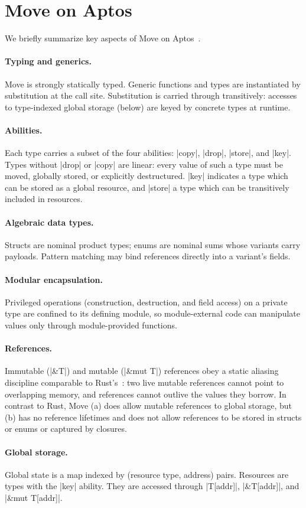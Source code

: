 \section{Move on Aptos}
\label{sec:move}

We briefly summarize key aspects of Move on Aptos~\cite{MoveOnAptosBook,blackshear2020resources}.

\paragraph{Typing and generics.}
Move is strongly statically typed.
Generic functions and types are instantiated by substitution at the call site.
Substitution is carried through transitively: accesses to type-indexed global storage (below) are keyed by concrete types at runtime.

\paragraph{Abilities.}
Each type carries a subset of the four abilities: |copy|, |drop|, |store|, and |key|.
Types without |drop| or |copy| are linear: every value of such a type must be moved, globally stored, or explicitly destructured.
|key| indicates a type which can be stored as a global resource, and |store| a type which can be transitively included in resources.

\paragraph{Algebraic data types.}
Structs are nominal product types; enums are nominal sums whose variants carry payloads.
Pattern matching may bind references directly into a variant's fields.

\paragraph{Modular encapsulation.}
Privileged operations (construction, destruction, and field access) on a private type are confined to its defining module, so module-external code can manipulate values only through module-provided functions.

\paragraph{References.}
Immutable (|&T|) and mutable (|&mut T|) references obey a static aliasing discipline comparable to Rust's~\cite{rust,rustbelt}: two live mutable references cannot point to overlapping memory, and references cannot outlive the values they borrow.
In contrast to Rust, Move (a) does allow mutable references to global storage, but (b) has no reference lifetimes and does not allow references to be stored in structs or enums or captured by closures.

\paragraph{Global storage.}
Global state is a map indexed by (resource type, address) pairs.
Resources are types with the |key| ability.
They are accessed through |T[addr]|, |&T[addr]|, and |&mut T[addr]|.

